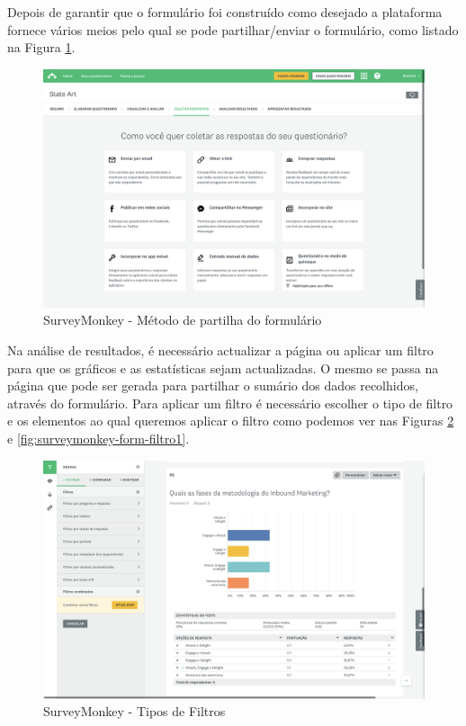 Depois de garantir que o formulário foi construído como desejado a plataforma fornece vários meios pelo qual se pode partilhar/enviar o formulário, como listado na Figura \ref{fig:surveymonkey-form-share}.

\newpage

\begin{figure}[ht!]
	\begin{center}
		\includegraphics[width=1\textwidth]{img/sm/surveymonkey-form-share}
		\caption{SurveyMonkey - Método de partilha do formulário }
		\label{fig:surveymonkey-form-share}
	\end{center}
\end{figure}

Na análise de resultados, é necessário actualizar a página ou aplicar um filtro para que os gráficos e as estatísticas sejam actualizadas. 
O mesmo se passa na página que pode ser gerada para partilhar o sumário dos dados recolhidos, através do formulário. 
Para aplicar um filtro é necessário escolher o tipo de filtro e os elementos ao qual queremos aplicar o filtro como podemos ver nas Figuras \ref{fig:surveymonkey-form-filtro} e \ref{fig:surveymonkey-form-filtro1}. 


\begin{figure}[ht!]
	\begin{center}
		\includegraphics[width=1\textwidth]{img/sm/surveymonkey-form-filtro}
		\caption{SurveyMonkey - Tipos de Filtros }
		\label{fig:surveymonkey-form-filtro}
	\end{center}
\end{figure}



